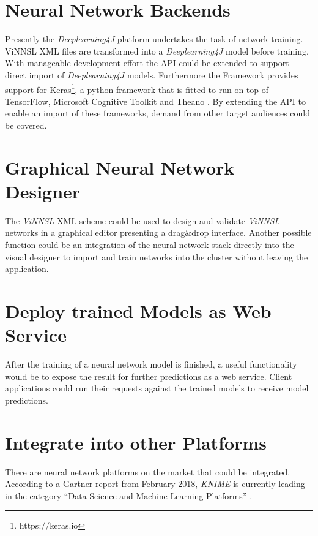 \section{Neural Network Backends}\label{neural-network-backends}

Presently the \emph{Deeplearning4J} platform undertakes the task of
network training. ViNNSL XML files are transformed into a
\emph{Deeplearning4J} model before training. With manageable development
effort the API could be extended to support direct import of
\emph{Deeplearning4J} models. Furthermore the Framework provides support
for Keras\footnote{https://keras.io}, a python framework that is fitted
to run on top of TensorFlow, Microsoft Cognitive Toolkit and Theano
\cite{dl4j-keras} \cite{keras}. By extending the API to enable an import
of these frameworks, demand from other target audiences could be
covered.

\section{Graphical Neural Network
Designer}\label{graphical-neural-network-designer}

The \emph{ViNNSL} XML scheme could be used to design and validate
\emph{ViNNSL} networks in a graphical editor presenting a drag\&drop
interface. Another possible function could be an integration of the
neural network stack directly into the visual designer to import and
train networks into the cluster without leaving the application.

\section{Deploy trained Models as Web
Service}\label{deploy-trained-models-as-web-service}

After the training of a neural network model is finished, a useful
functionality would be to expose the result for further predictions as a
web service. Client applications could run their requests against the
trained models to receive model predictions.

\section{Integrate into other
Platforms}\label{integrate-into-other-platforms}

There are neural network platforms on the market that could be
integrated. According to a Gartner report from February 2018,
\emph{KNIME} is currently leading in the category ``Data Science and
Machine Learning Platforms'' \cite{gartner}.

